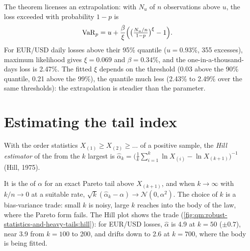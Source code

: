 The theorem licenses an extrapolation: with $N_u$ of $n$ observations above $u$, the loss exceeded with probability $1 - p$ is
\[
\mathrm{VaR}_p = u + \frac\beta\xi\Bigl(\bigl(\tfrac{N_u/n}{1 - p}\bigr)^\xi - 1\Bigr).
\]
For EUR/USD daily losses above their 95\% quantile ($u = 0.93\%$, 355 excesses), maximum likelihood gives $\xi = 0.069$ and $\beta = 0.34\%$,
and the one-in-a-thousand-days loss is 2.47\%. The fitted $\xi$ depends on the threshold (0.03 above the 90\% quantile, 0.21 above the
99\%), the quantile much less (2.43\% to 2.49\% over the same thresholds): the extrapolation is steadier than the parameter.

\section{Estimating the tail index}

\begin{definition}\label{def:qm:robust-statistics-and-heavy-tails:hill}
With the order statistics $X_{(1)} \ge X_{(2)} \ge \dots$ of a positive sample, the \emph{Hill estimator} of the 
from the $k$ largest is $\hat\alpha_k = \bigl(\frac1k\sum_{i=1}^k\ln X_{(i)} - \ln X_{(k+1)}\bigr)^{-1}$ (Hill, 1975).
\end{definition}

It is the  of $\alpha$ for an exact Pareto tail above $X_{(k+1)}$, and when $k \to \infty$ with $k/n \to 0$ at a
suitable rate, $\sqrt k(\hat\alpha_k - \alpha) \to \mathcal N(0, \alpha^2)$. The choice of $k$ is a bias-variance trade: small $k$ is noisy,
large $k$ reaches into the body of the law, where the Pareto form fails. The Hill plot shows the trade
(\cref{fig:qm:robust-statistics-and-heavy-tails:hill}): for EUR/USD losses, $\hat\alpha$ is 4.9 at $k = 50$ ($\pm 0.7$), near 3.9 from $k =
100$ to 200, and drifts down to 2.6 at $k = 700$, where the body is being fitted.

